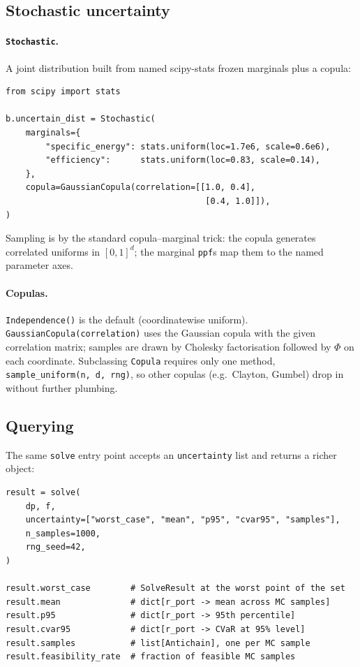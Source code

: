\documentclass[11pt,a4paper]{article}
\begin{document}
\subsection{Stochastic uncertainty}

\paragraph{\texttt{Stochastic}.} A joint distribution built from
named scipy-stats frozen marginals plus a copula:
\begin{lstlisting}
from scipy import stats

b.uncertain_dist = Stochastic(
    marginals={
        "specific_energy": stats.uniform(loc=1.7e6, scale=0.6e6),
        "efficiency":      stats.uniform(loc=0.83, scale=0.14),
    },
    copula=GaussianCopula(correlation=[[1.0, 0.4],
                                        [0.4, 1.0]]),
)
\end{lstlisting}
Sampling is by the standard copula--marginal trick: the copula
generates correlated uniforms in $[0,1]^d$; the marginal \texttt{ppf}s
map them to the named parameter axes.

\paragraph{Copulas.} \texttt{Independence()} is the default
(coordinatewise uniform). \texttt{GaussianCopula(correlation)} uses
the Gaussian copula with the given correlation matrix; samples are
drawn by Cholesky factorisation followed by $\Phi$ on each
coordinate. Subclassing \texttt{Copula} requires only one method,
\texttt{sample\_uniform(n, d, rng)}, so other copulas (e.g.\ Clayton,
Gumbel) drop in without further plumbing.

\subsection{Querying}

The same \texttt{solve} entry point accepts an \texttt{uncertainty}
list and returns a richer object:
\begin{lstlisting}
result = solve(
    dp, f,
    uncertainty=["worst_case", "mean", "p95", "cvar95", "samples"],
    n_samples=1000,
    rng_seed=42,
)

result.worst_case        # SolveResult at the worst point of the set
result.mean              # dict[r_port -> mean across MC samples]
result.p95               # dict[r_port -> 95th percentile]
result.cvar95            # dict[r_port -> CVaR at 95% level]
result.samples           # list[Antichain], one per MC sample
result.feasibility_rate  # fraction of feasible MC samples
\end{lstlisting}
\end{document}
